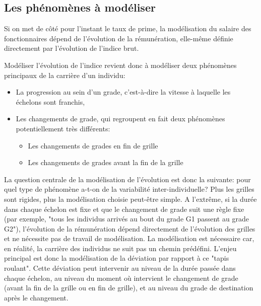 \documentclass[11pt,a4paper]{article}
\begin{document}
\subsection*{Les phénomènes à modéliser}

Si on met de côté pour l'instant le taux de prime, la modélisation du salaire des fonctionnaires dépend de l'évolution de la rémunération, elle-même définie directement par l'évolution de l'indice brut. 

Modéliser l'évolution de l'indice revient donc à modéliser deux phénomènes principaux de la carrière d'un individu: 
\begin{itemize}[leftmargin=1cm ,parsep=0cm,itemsep=0cm,topsep=0cm] 
\item La progression au sein d'un grade, c'est-à-dire la vitesse à laquelle les échelons sont franchis,
\item Les changements de grade, qui regroupent en fait deux phénomènes potentiellement très différents: 
	\begin{itemize}[leftmargin=1cm ,parsep=0cm,itemsep=0cm,topsep=0cm] 
	\item Les changements de grades en fin de grille
	\item Les changements de grades avant la fin de la grille
	\end{itemize}
\end{itemize} 

\vspace{0.2cm}

La question centrale de la modélisation de l'évolution est donc la suivante: pour quel type de phénomène a-t-on de la variabilité inter-individuelle? Plus les grilles sont rigides, plus la modélisation choisie peut-être simple. A l'extrême, si la durée dans chaque échelon est fixe et que le changement de grade suit une règle fixe (par exemple, "tous les individus arrivés au bout du grade G1 passent au grade G2"), l'évolution de la rémunération dépend directement de l'évolution des grilles et ne nécessite pas de travail de modélisation. La modélisation est nécessaire car, en réalité, la carrière des individus ne suit pas un chemin prédéfini. L'enjeu principal est donc la modélisation de la déviation par rapport à ce "tapis roulant". Cette déviation peut intervenir au niveau de la durée passée dans chaque échelon, au niveau du moment où intervient le changement de grade (avant la fin de la grille ou en fin de grille), et au niveau du grade de destination après le changement. 
\end{document}
